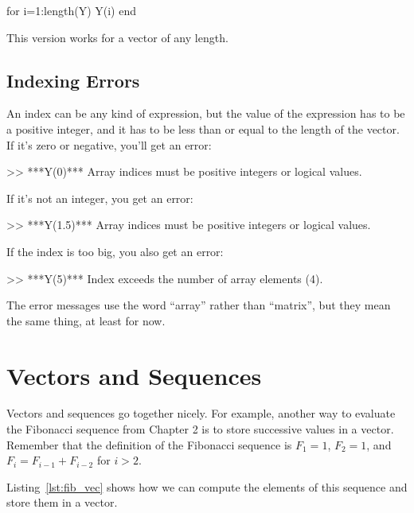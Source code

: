 \begin{code}
for i=1:length(Y)
     Y(i)
end
\end{code}

This version works for a vector of any length.


\subsection{Indexing Errors}


An index can be any kind of expression, but the value of the
expression has to be a positive integer, and it has to be
less than or equal to the length of the vector.  If it's
zero or negative, you'll get an error:

\begin{code}
>> ***Y(0)***
Array indices must be positive integers or logical values.
\end{code}

If it's not an integer, you get an error:

\begin{code}
>> ***Y(1.5)***
Array indices must be positive integers or logical values.
\end{code}

If the index is too big, you also get an error:

\begin{code}
>> ***Y(5)***
Index exceeds the number of array elements (4).
\end{code}

The error messages use the word ``array'' rather than ``matrix'', 
but they mean the same thing, at least for now.


\section{Vectors and Sequences}
\label{vecseq}


Vectors and sequences go together nicely.
For example, another way to evaluate the Fibonacci sequence from Chapter 2 is to
store successive values in a vector.  Remember that the definition of the
Fibonacci sequence is $F_1 = 1$, $F_2 = 1$, and
$F_{i} = F_{i-1} + F_{i-2}$ for $i > 2$.

Listing~\ref{lst:fib_vec} shows how we can compute the elements of this sequence and store them in a vector.

